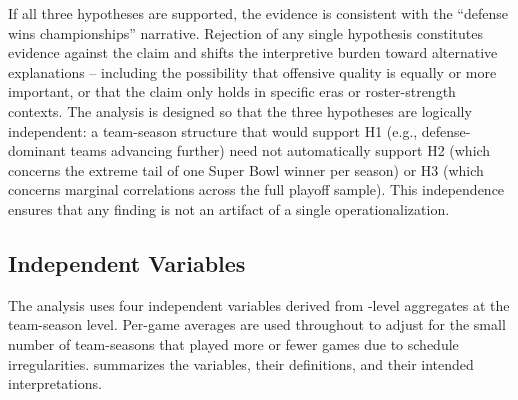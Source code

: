 If all three hypotheses are supported, the evidence is consistent with the
``defense wins championships'' narrative. Rejection of any single hypothesis
constitutes evidence against the claim and shifts the interpretive burden toward
alternative explanations -- including the possibility that offensive quality is
equally or more important, or that the claim only holds in specific eras or
roster-strength contexts. The analysis is designed so that the three hypotheses
are logically independent: a team-season structure that would support H1 (e.g.,
defense-dominant teams advancing further) need not automatically support H2
(which concerns the extreme tail of one Super Bowl winner per season) or H3
(which concerns marginal correlations across the full playoff sample). This
independence ensures that any finding is not an artifact of a single operationalization.

\subsection{Independent Variables}
\label{sec:ivs}

The analysis uses four independent variables derived from \gds{}-level
aggregates at the team-season level. Per-game averages are used throughout
to adjust for the small number of team-seasons that played more or fewer
games due to schedule irregularities.  summarizes the variables,
their definitions, and their intended interpretations.

